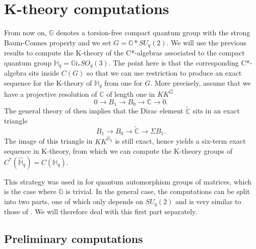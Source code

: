 \documentclass[a4paper, 11pt]{amsart}
\theoremstyle{plain}
\theoremstyle{definition}
\theoremstyle{remark}
\newcommand{\C}{\mathbb{C}}
\newcommand{\G}{\mathbb{G}}
\newcommand{\HH}{\mathbb{H}}
\begin{document}
\section{K-theory computations}\label{sec:ktheory}

From now on, $\G$ denotes a torsion-free compact quantum group with the strong Baum-Connes property and we set $G = \G\ast SU_{q}(2)$. We will use the previous results to compute the K-theory of the C*-algebras associated to the compact quantum group $\HH_{q} = \G\wr_{\ast} SO_{q}(3)$. The point here is that the corresponding C*-algebra sits inside $C(G)$ so that we can use restriction to produce an exact sequence for the K-theory of $\HH_{q}$ from one for $G$. More precisely, assume that we have a projective resolution of $\C$ of length one in $KK^{\widehat{G}}$
\begin{equation*}
0 \longrightarrow B_{1} \longrightarrow B_{0} \longrightarrow \C \longrightarrow 0.
\end{equation*}
The general theory of \cite{meyer2006baum} then implies that the Dirac element $\widetilde{\C}$ sits in an exact triangle
\begin{equation}
B_{1} \longrightarrow B_{0} \longrightarrow \widetilde{\C} \longrightarrow \Sigma B_{1}.
\end{equation}
The image of this triangle in $KK^{\widehat{\HH}_{q}}$ is still exact, hence yields a six-term exact sequence in K-theory, from which we can compute the K-theory groups of $C^{*}(\widehat{\HH}_{q}) = C(\HH_{q})$.

This strategy was used in \cite[Sec 5]{voigt2012quantum} for quantum automorphism groups of matrices, which is the case where $\G$ is trivial. In the general case, the computations can be split into two parts, one of which only depends on $SU_{q}(2)$ and is very similar to those of \cite[Sec 5]{voigt2012quantum}. We will therefore deal with this first part separately.

\subsection{Preliminary computations}
\end{document}
